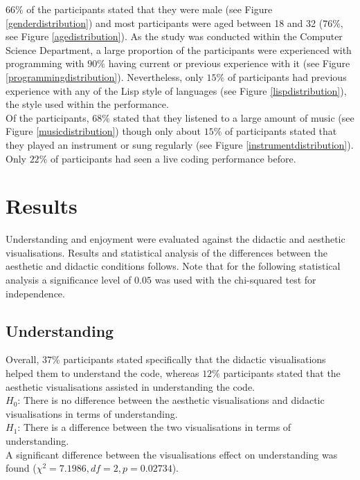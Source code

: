 $66\%$ of the participants stated that they were male (see Figure \ref{genderdistribution}) and most participants were aged between 18 and 32 ($76\%$, see Figure \ref{agedistribution}). As the study was conducted within the Computer Science Department, a large proportion of the participants were experienced with programming with $90\%$ having current or previous experience with it (see Figure \ref{programmingdistribution}). Nevertheless, only $15\%$ of participants had previous experience with any of the Lisp style of languages (see Figure \ref{lispdistribution}), the style used within the performance.\\

Of the participants, $68\%$ stated that they listened to a large amount of music (see Figure \ref{musicdistribution}) though only about $15\%$ of participants stated that they played an instrument or sung regularly (see Figure \ref{instrumentdistribution}). Only $22\%$ of participants had seen a live coding performance before.

\section{Results}

Understanding and enjoyment were evaluated against the didactic and aesthetic visualisations. Results and statistical analysis of the differences between the aesthetic and didactic conditions follows. Note that for the following statistical analysis a significance level of $0.05$ was used with the chi-squared test for independence.

\subsection{Understanding}

Overall, $37\%$ participants stated specifically that the didactic visualisations helped them to understand the code, whereas $12\%$ participants stated that the aesthetic visualisations assisted in understanding the code.\\

$H_0$: There is no difference between the aesthetic visualisations and didactic visualisations in terms of understanding.\\
$H_1$: There is a difference between the two visualisations in terms of understanding.\\

A significant difference between the visualisations effect on understanding was found ($\chi^2=7.1986,df=2,p=0.02734$).

